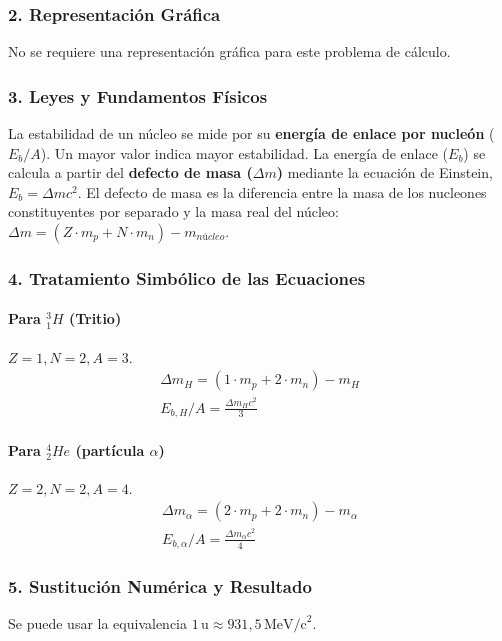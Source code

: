 \subsubsection*{2. Representación Gráfica}
No se requiere una representación gráfica para este problema de cálculo.

\subsubsection*{3. Leyes y Fundamentos Físicos}
La estabilidad de un núcleo se mide por su \textbf{energía de enlace por nucleón} ($E_b/A$). Un mayor valor indica mayor estabilidad.
La energía de enlace ($E_b$) se calcula a partir del \textbf{defecto de masa ($\Delta m$)} mediante la ecuación de Einstein, $E_b = \Delta m c^2$.
El defecto de masa es la diferencia entre la masa de los nucleones constituyentes por separado y la masa real del núcleo: $\Delta m = (Z \cdot m_p + N \cdot m_n) - m_{núcleo}$.

\subsubsection*{4. Tratamiento Simbólico de las Ecuaciones}
\paragraph*{Para ${}_{1}^{3}H$ (Tritio)}
$Z=1, N=2, A=3$.
\begin{gather}
    \Delta m_H = (1 \cdot m_p + 2 \cdot m_n) - m_H \\
    E_{b,H}/A = \frac{\Delta m_H c^2}{3}
\end{gather}
\paragraph*{Para ${}_{2}^{4}He$ (partícula $\alpha$)}
$Z=2, N=2, A=4$.
\begin{gather}
    \Delta m_\alpha = (2 \cdot m_p + 2 \cdot m_n) - m_\alpha \\
    E_{b,\alpha}/A = \frac{\Delta m_\alpha c^2}{4}
\end{gather}

\subsubsection*{5. Sustitución Numérica y Resultado}
Se puede usar la equivalencia $1\,\text{u} \approx 931,5\,\text{MeV/c}^2$.
